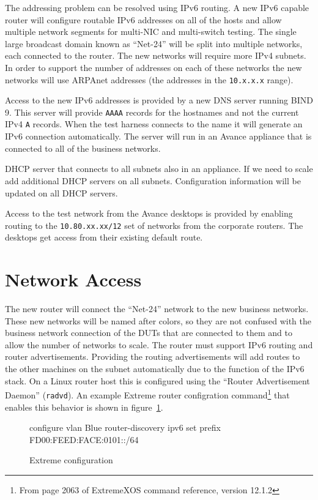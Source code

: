 \documentclass[twoside]{article}
\begin{document}
The addressing problem can be resolved using IPv6 routing.
A new IPv6 capable router will configure routable IPv6 addresses
on all of the hosts and allow multiple network segments for
multi-NIC and multi-switch testing.
The single large broadcast domain known as ``Net-24'' will be split into 
multiple networks, each connected to the router.
The new networks will require more IPv4 subnets.
In order to support the number of addresses on each of these networks
the new networks will use
ARPAnet addresses (the addresses in the \verb+10.x.x.x+ range).

Access to the new IPv6 addresses is provided by a new DNS server running BIND 9.
This server will provide \verb+AAAA+ records for the hostnames and not
the current IPv4 \verb+A+ records.
When the test harness connects to the name it will generate an IPv6 
connection automatically.
The server will run in an Avance appliance that is connected to all of
the business networks.

DHCP server that connects to all subnets also in an appliance.
If we need to scale add additional DHCP servers on all subnets.
Configuration information will be updated on all DHCP servers.

Access to the test network from the Avance desktops is provided by
enabling routing to the \verb+10.80.xx.xx/12+ set of networks from
the corporate routers.  The desktops get access from their existing
default route.

\section{Network Access}

The new router will connect the ``Net-24'' network to the new business networks.
These new networks will be named after colors, so they are not confused with
the business network connection of the DUTs that are connected to them
and to allow the number of networks to scale.
The router must support IPv6 routing and router advertisements.
Providing the routing advertisements will add routes to the other
machines on the subnet automatically due to the function of the IPv6 stack.
On a Linux router host this is configured using
the ``Router Advertisement Daemon'' (\verb+radvd+).
An example Extreme router configration command\footnote{From page 2063
of ExtremeXOS command reference, version 12.1.2}
that enables this behavior is shown in figure~\ref{router:advertisement:config}.

\begin{figure}[!h]
\begin{center}
\begin{small}
\begin{boxedverbatim}
configure vlan Blue router-discovery ipv6 set prefix FD00:FEED:FACE:0101::/64
\end{boxedverbatim}
\end{small}
\end{center}
\caption{Extreme configuration}\label{router:advertisement:config}
\end{figure}
\end{document}
